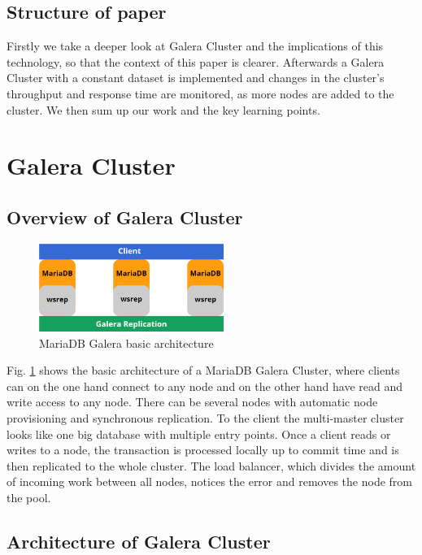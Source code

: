 \documentclass{sig-alternate}
\begin{document}
\subsection{Structure of paper}
Firstly we take a deeper look at Galera Cluster and the implications of this technology, so that the context of this paper is clearer. Afterwards a Galera Cluster with a constant dataset is implemented and changes in the cluster’s throughput and response time are monitored, as more nodes are added to the cluster. We then sum up our work and the key learning points.

\section{Galera Cluster}
\subsection{Overview of Galera Cluster}

\begin{figure}[ht]
	\centering
	\includegraphics[width=6cm]{galera1-2.png}
	\caption{MariaDB Galera basic architecture}
	\label{fig:galera_structure}
\end{figure}

Fig. \ref{fig:galera_structure} shows the basic architecture of a MariaDB Galera Cluster, where clients can on the one hand connect to any node and on the other hand have read and write access to any node. There can be several nodes with automatic node provisioning and synchronous replication. To the client the multi-master cluster looks like one big database with multiple entry points. Once a client reads or writes to a node, the transaction is processed locally up to commit time and is then replicated to the whole cluster. The load balancer, which divides the amount of incoming work between all nodes, notices the error and removes the node from the pool.

\subsection{Architecture of Galera Cluster}
\end{document}
